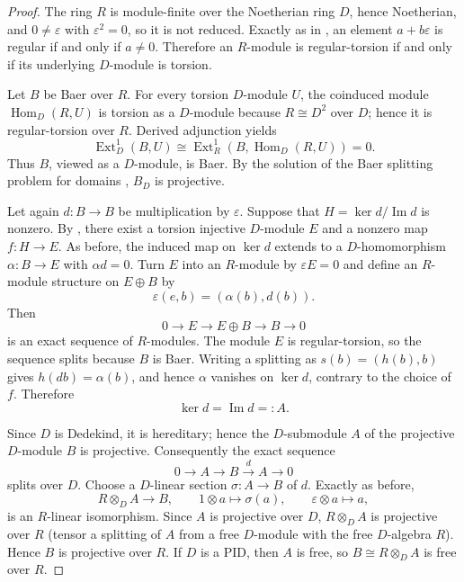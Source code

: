 \documentclass[11pt]{article}
\theoremstyle{definition}
\theoremstyle{remark}
\newcommand{\Ext}{\operatorname{Ext}}
\newcommand{\Hom}{\operatorname{Hom}}
\begin{document}
\begin{proof}
The ring $R$ is module-finite over the Noetherian ring $D$, hence Noetherian,
and $0\neq\varepsilon$ with $\varepsilon^2=0$, so it is not reduced.
Exactly as in , an element $a+b\varepsilon$ is regular if and
only if $a\neq0$.  Therefore an $R$-module is regular-torsion if and only if
its underlying $D$-module is torsion.

Let $B$ be Baer over $R$.  For every torsion $D$-module $U$, the coinduced
module $\Hom_D(R,U)$ is torsion as a $D$-module because
$R\cong D^2$ over $D$; hence it is regular-torsion over $R$.  Derived
adjunction yields
\[
 \Ext_D^1(B,U)
 \cong
 \Ext_R^1\!\left(B,\Hom_D(R,U)\right)=0.
\]
Thus $B$, viewed as a $D$-module, is Baer.  By the solution of the Baer
splitting problem for domains \cite{ABH}, $B_D$ is projective.

Let again $d:B\to B$ be multiplication by $\varepsilon$.  Suppose that
$H=\ker d/\operatorname{Im}d$ is nonzero.  By
, there exist a torsion injective
$D$-module $E$ and a nonzero map $f:H\to E$.  As before, the induced map on
$\ker d$ extends to a $D$-homomorphism $\alpha:B\to E$ with
$\alpha d=0$.  Turn $E$ into an $R$-module by $\varepsilon E=0$ and define
an $R$-module structure on $E\oplus B$ by
\[
 \varepsilon(e,b)=(\alpha(b),d(b)).
\]
Then
\[
 0\longrightarrow E\longrightarrow E\oplus B\longrightarrow B
 \longrightarrow0
\]
is an exact sequence of $R$-modules.  The module $E$ is regular-torsion, so
the sequence splits because $B$ is Baer.  Writing a splitting as
$s(b)=(h(b),b)$ gives $h(db)=\alpha(b)$, and hence $\alpha$ vanishes on
$\ker d$, contrary to the choice of $f$.  Therefore
\[
 \ker d=\operatorname{Im}d=:A.
\]

Since $D$ is Dedekind, it is hereditary; hence the $D$-submodule $A$ of the
projective $D$-module $B$ is projective.  Consequently the exact sequence
\[
 0\longrightarrow A\longrightarrow B\xrightarrow{d}A\longrightarrow0
\]
splits over $D$.  Choose a $D$-linear section $\sigma:A\to B$ of $d$.
Exactly as before,
\[
 R\otimes_DA\longrightarrow B,
 \qquad
 1\otimes a\longmapsto\sigma(a),\qquad
 \varepsilon\otimes a\longmapsto a,
\]
is an $R$-linear isomorphism.  Since $A$ is projective over $D$,
$R\otimes_DA$ is projective over $R$ (tensor a splitting of $A$ from a free
$D$-module with the free $D$-algebra $R$).  Hence $B$ is projective over $R$.
If $D$ is a PID, then $A$ is free, so $B\cong R\otimes_DA$ is free over $R$.
\end{proof}
\end{document}
